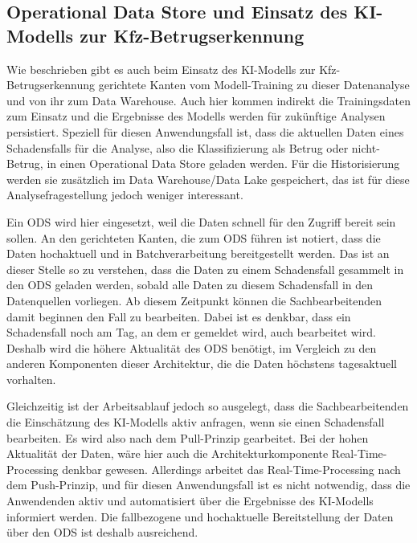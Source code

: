 \subsection[Operational Data Store und Einsatz des KI-Modells
\texorpdfstring{\protect\\}{ }zur Kfz-Betrugserkennung]
{Operational Data Store und Einsatz des KI-Modells zur Kfz-Betrugserkennung}

Wie beschrieben gibt es auch beim Einsatz des KI-Modells zur
Kfz-Betrugserkennung gerichtete Kanten vom Modell-Training 
zu dieser Datenanalyse und von ihr zum Data Warehouse.
Auch hier kommen indirekt die Trainingsdaten zum Einsatz
und die Ergebnisse des Modells werden für zukünftige Analysen persistiert.
Speziell für diesen Anwendungsfall ist,
dass die aktuellen Daten eines Schadensfalls 
für die Analyse, also die Klassifizierung als Betrug oder nicht-Betrug,
in einen Operational Data Store geladen werden.
Für die Historisierung werden sie zusätzlich im Data Warehouse/Data Lake
gespeichert, das ist für diese Analysefragestellung jedoch weniger interessant.

Ein ODS wird hier eingesetzt, weil die Daten schnell für den Zugriff bereit sein sollen.
An den gerichteten Kanten, die zum ODS führen ist notiert, 
dass die Daten hochaktuell und in Batchverarbeitung bereitgestellt werden.
Das ist an dieser Stelle so zu verstehen, 
dass die Daten zu einem Schadensfall gesammelt in den ODS geladen werden,
sobald alle Daten zu diesem Schadensfall in den Datenquellen vorliegen.
Ab diesem Zeitpunkt können die Sachbearbeitenden 
damit beginnen den Fall zu bearbeiten. 
Dabei ist es denkbar, dass ein Schadensfall
noch am Tag, an dem er gemeldet wird, auch bearbeitet wird.
Deshalb wird die höhere Aktualität des ODS benötigt, 
im Vergleich zu den anderen Komponenten dieser Architektur,
die die Daten höchstens tagesaktuell vorhalten.

Gleichzeitig ist der Arbeitsablauf jedoch so ausgelegt,
dass die Sachbearbeitenden die Einschätzung des KI-Modells 
aktiv anfragen, wenn sie einen Schadensfall bearbeiten. 
Es wird also nach dem Pull-Prinzip gearbeitet.
Bei der hohen Aktualität der Daten,
wäre hier auch die Architekturkomponente Real-Time-Processing
denkbar gewesen. 
Allerdings arbeitet das Real-Time-Processing nach dem Push-Prinzip,
und für diesen Anwendungsfall ist es nicht notwendig,
dass die Anwendenden aktiv und automatisiert über die Ergebnisse 
des KI-Modells informiert werden. 
Die fallbezogene und hochaktuelle Bereitstellung der Daten
über den ODS ist deshalb ausreichend.

